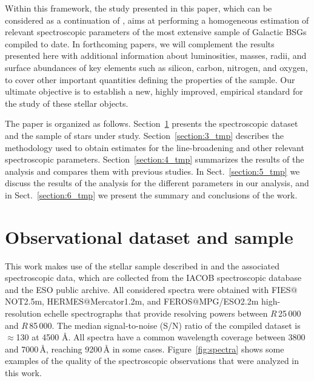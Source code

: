 \documentclass{aa}
\let\oldAA\AA
\renewcommand*{\AA}{\,\oldAA\xspace}
\begin{document}
Within this framework, the study presented in this paper, which can be considered as a continuation of \citet{deburgos23}, aims at performing a homogeneous estimation of relevant spectroscopic parameters of the most extensive sample of Galactic BSGs compiled to date. In forthcoming papers, we will complement the results presented here with additional information about luminosities, masses, radii, and surface abundances of key elements such as silicon, carbon, nitrogen, and oxygen, to cover other important quantities defining the properties of the sample. Our ultimate objective is to establish a new, highly improved, empirical standard for the study of these stellar objects.

The paper is organized as follows. Section~\ref{section:2_tmp} presents the spectroscopic dataset and the sample of stars under study. Section~\ref{section:3_tmp} describes the methodology used to obtain estimates for the line-broadening and other relevant spectroscopic parameters. Section~\ref{section:4_tmp} summarizes the results of the analysis and compares them with previous studies. In Sect.~\ref{section:5_tmp} we discuss the results of the analysis for the different parameters in our analysis, and in Sect.~\ref{section:6_tmp} we present the summary and conclusions of the work. 






\section{Observational dataset and sample}
\label{section:2_tmp}

This work makes use of the stellar sample described in \citet{deburgos23} and the associated spectroscopic data, which are collected from the IACOB spectroscopic database \citep[for the latest review see][]{simon-diaz20} and the ESO public archive. All considered spectra were obtained with FIES$@$NOT2.5m, HERMES$@$Mercator1.2m, and FEROS$@$MPG/ESO2.2m high-resolution echelle spectrographs that provide resolving powers between $R$\,25\,000 and $R$\,85\,000. The median signal-to-noise (S/N) ratio of the compiled dataset is $\approx$130 at 4500\,\AA. All spectra have a common wavelength coverage between 3800 and 7000\AA, reaching 9200\AA in some cases. Figure~\ref{fig:spectra} shows some examples of the quality of the spectroscopic observations that were analyzed in this work. 
\end{document}
